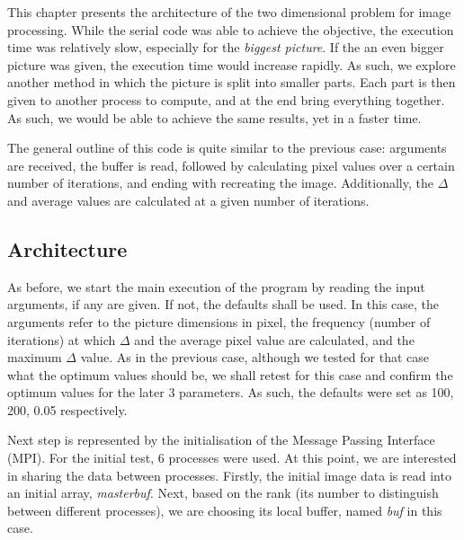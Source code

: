 \documentclass[11pt]{article}
\begin{document}
	This chapter presents the architecture of the two dimensional problem for image processing. While the serial code was able to achieve the objective, the execution time was relatively slow, especially for the \textit{biggest picture}. If the an even bigger picture was given, the execution time would increase rapidly. As such, we explore another method in which the picture is split into smaller parts. Each part is then given to another process to compute, and at the end bring everything together. As such, we would be able to achieve the same results, yet in a faster time. 
	
	The general outline of this code is quite similar to the previous case: arguments are received, the buffer is read, followed by calculating pixel values over a certain number of iterations, and ending with recreating the image. Additionally, the $\Delta$  and average values are calculated at a given number of iterations.
	
	\subsection{Architecture}
	As before, we start the main execution of the program by reading the input arguments, if any are given. If not, the defaults shall be used. In this case, the arguments refer to the picture dimensions in pixel, the frequency (number of iterations) at which $\Delta$ and the average pixel value are calculated, and the maximum $\Delta$ value. As in the previous case, although we tested for that case what the optimum values should be, we shall retest for this case and confirm the optimum values for the later 3 parameters. As such, the defaults were set as 100, 200, 0.05 respectively. 
	
	Next step is represented by the initialisation of the Message Passing Interface (MPI). For the initial test, 6 processes were used. At this point, we are interested in sharing the data between processes. Firstly, the initial image data is read into an initial array, \textit{masterbuf}. Next, based on the rank (its number to distinguish between different processes), we are choosing its local buffer, named \textit{buf} in this case.  
	
	
	
\end{document}
